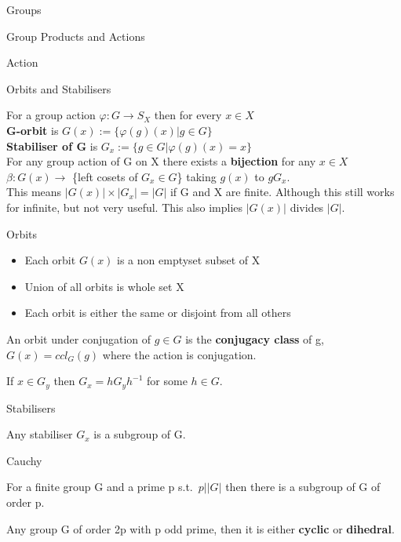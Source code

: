\documentclass[12pt, letterpaper]{article}
\begin{document}
\begin{section}{Groups}
\begin{subsection}{Group Products and Actions}
\begin{subsubsection}{Action}
    \end{subsubsection}

  \end{subsection}

  \begin{subsection}{Orbits and Stabilisers}

    For a group action \(\varphi : G \to S_{X}\) then for every \(x \in X\) \\
    \textbf{G-orbit} is \(G(x) := \{ \varphi(g)(x) | g \in G \}\) \\
    \textbf{Stabiliser of G} is \(G_{x} := \{ g \in G | \varphi(g)(x) = x \}\) \\

    For any group action of G on X there exists a \textbf{bijection} for any
    \(x \in X\) \(\beta : G(x) \to\) \{left cosets of \(G_{x} \in G\)\} taking
    \(g(x)\) to \(gG_{x}\). \\
    This means \(|G(x)| \times |G_{x}| = |G|\) if G and X are finite. Although
    this still works for infinite, but not very useful. This also implies
    \(|G(x)|\) divides \(|G|\).

    \begin{subsubsection}{Orbits}

      \begin{itemize}
        \item Each orbit \(G(x)\) is a non emptyset subset of X
        \item Union of all orbits is whole set X
        \item Each orbit is either the same or disjoint from all others
      \end{itemize}

      An orbit under conjugation of \(g \in G\) is the \textbf{conjugacy class}
      of g, \(G(x) = ccl_{G}(g)\) where the action is conjugation.

      If \(x \in G_{y}\) then \(G_{x} = hG_{y}h^{-1}\) for some \(h \in G\).

    \end{subsubsection}

    \begin{subsubsection}{Stabilisers}

      Any stabiliser \(G_{x}\) is a subgroup of G.

    \end{subsubsection}

  \end{subsection}

  \begin{subsection}{Cauchy}

    For a finite group G and a prime p s.t.\ \(p | |G|\) then there is a
    subgroup of G of order p.

    Any group G of order 2p with p odd prime, then it is either \textbf{cyclic}
    or \textbf{dihedral}.

  \end{subsection}

\end{section}
\end{document}
